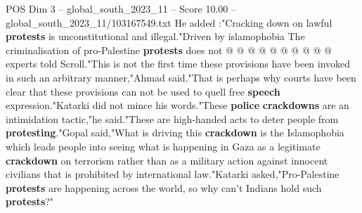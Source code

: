 \begin{textsample}{POS Dim 3 – global\_south\_2023\_11 – Score 10.00 – global\_south\_2023\_11/103167549.txt}
He added :"Cracking down on lawful \textbf{protests} is unconstitutional and illegal."Driven by islamophobia The criminalisation of pro-Palestine \textbf{protests} does not @ @ @ @ @ @ @ @ @ @ experts told Scroll."This is not the first time these provisions have been invoked in such an arbitrary manner,"Ahmad said."That is perhaps why courts have been clear that these provisions can not be used to quell free \textbf{speech} expression."Katarki did not mince his words."These \textbf{police} \textbf{crackdowns} are an intimidation tactic,"he said."These are high-handed acts to deter people from \textbf{protesting}."Gopal said,"What is driving this \textbf{crackdown} is the Islamophobia which leads people into seeing what is happening in Gaza as a legitimate \textbf{crackdown} on terrorism rather than as a military action against innocent civilians that is prohibited by international law."Katarki asked,"Pro-Palestine \textbf{protests} are happening across the world, so why can't Indians hold such \textbf{protests}?"

\end{textsample}
